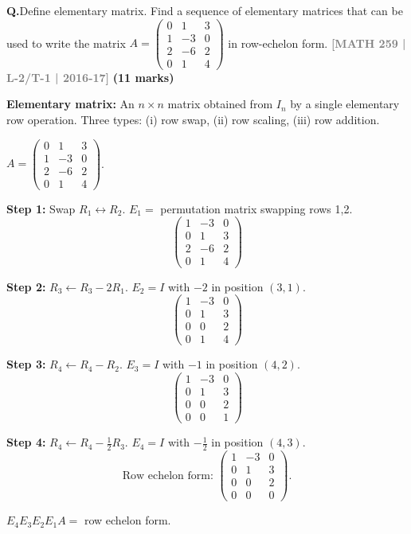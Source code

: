 \documentclass[12pt,a3paper]{article}
\newcommand{\yr}[1]{\hfill\textcolor{gray}{\small\textbf{[#1]}}}
\newcommand{\mk}[1]{\textcolor{orange!70!black}{\small\textbf{(#1 marks)}}}
\newcounter{qnum}
\newcommand{\Q}[1]{%
  \needspace{4\baselineskip}
  \refstepcounter{qnum}
  \vspace{6pt}
  \noindent\textbf{Q\theqnum.}\enspace #1\par
}
\begin{document}
\Q{Define elementary matrix. Find a sequence of elementary matrices that can be used to write the matrix $A = \begin{pmatrix} 0 & 1 & 3 \\ 1 & -3 & 0 \\ 2 & -6 & 2 \\ 0 & 1 & 4 \end{pmatrix}$ in row-echelon form.
\yr{MATH 259 | L-2/T-1 | 2016-17} \mk{11}}

\begin{tcolorbox}[enhanced,breakable,
  colback=cB!4,colframe=cB,boxrule=0.8pt,arc=5pt,
  title={\textbf{Answer --- Elementary Matrices to Row-Echelon Form}},
  fonttitle=\bfseries\color{white},colbacktitle=cB]

\textbf{Elementary matrix:} An $n\times n$ matrix obtained from $I_n$ by a single elementary row operation. Three types: (i) row swap, (ii) row scaling, (iii) row addition.

\medskip
$A=\begin{pmatrix}0&1&3\\1&-3&0\\2&-6&2\\0&1&4\end{pmatrix}$.

\textbf{Step 1:} Swap $R_1\leftrightarrow R_2$. $E_1=$ permutation matrix swapping rows 1,2.
\[
\begin{pmatrix}1&-3&0\\0&1&3\\2&-6&2\\0&1&4\end{pmatrix}
\]

\textbf{Step 2:} $R_3\leftarrow R_3-2R_1$. $E_2=I$ with $-2$ in position $(3,1)$.
\[
\begin{pmatrix}1&-3&0\\0&1&3\\0&0&2\\0&1&4\end{pmatrix}
\]

\textbf{Step 3:} $R_4\leftarrow R_4-R_2$. $E_3=I$ with $-1$ in position $(4,2)$.
\[
\begin{pmatrix}1&-3&0\\0&1&3\\0&0&2\\0&0&1\end{pmatrix}
\]

\textbf{Step 4:} $R_4\leftarrow R_4-\frac{1}{2}R_3$. $E_4=I$ with $-\frac{1}{2}$ in position $(4,3)$.
\[
\text{Row echelon form: }\begin{pmatrix}1&-3&0\\0&1&3\\0&0&2\\0&0&0\end{pmatrix}.
\]

$E_4 E_3 E_2 E_1 A = $ row echelon form.

\end{tcolorbox}
\end{document}
